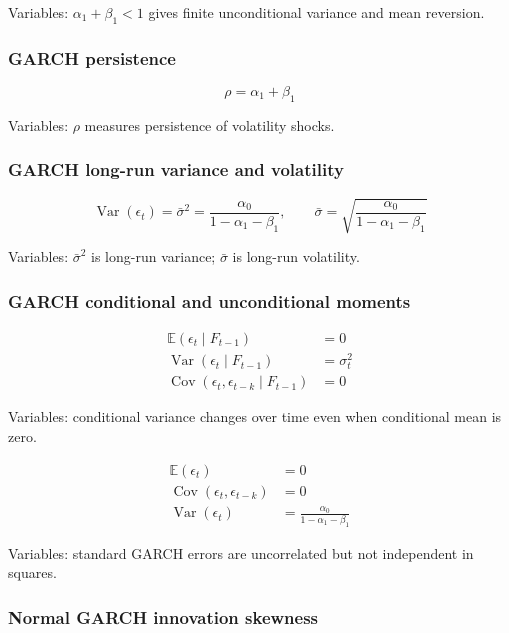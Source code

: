\documentclass[
  8pt,
  twocolumn]{extarticle}
\begin{document}
Variables: \(\alpha_1+\beta_1<1\) gives finite unconditional variance
and mean reversion.

\subsubsection{GARCH persistence}\label{garch-persistence}

\[
\rho=\alpha_1+\beta_1
\]

Variables: \(\rho\) measures persistence of volatility shocks.

\subsubsection{GARCH long-run variance and
volatility}\label{garch-long-run-variance-and-volatility}

\[
\operatorname{Var}(\epsilon_t)=\bar\sigma^2=\frac{\alpha_0}{1-\alpha_1-\beta_1},\qquad
\bar\sigma=\sqrt{\frac{\alpha_0}{1-\alpha_1-\beta_1}}
\]

Variables: \(\bar\sigma^2\) is long-run variance; \(\bar\sigma\) is
long-run volatility.

\subsubsection{GARCH conditional and unconditional
moments}\label{garch-conditional-and-unconditional-moments}

\[
\begin{aligned}
\mathbb E(\epsilon_t\mid F_{t-1})&=0\\
\operatorname{Var}(\epsilon_t\mid F_{t-1})&=\sigma_t^2\\
\operatorname{Cov}(\epsilon_t,\epsilon_{t-k}\mid F_{t-1})&=0
\end{aligned}
\]

Variables: conditional variance changes over time even when conditional
mean is zero.

\[
\begin{aligned}
\mathbb E(\epsilon_t)&=0\\
\operatorname{Cov}(\epsilon_t,\epsilon_{t-k})&=0\\
\operatorname{Var}(\epsilon_t)&=\frac{\alpha_0}{1-\alpha_1-\beta_1}
\end{aligned}
\]

Variables: standard GARCH errors are uncorrelated but not independent in
squares.

\subsubsection{Normal GARCH innovation
skewness}\label{normal-garch-innovation-skewness}
\end{document}
